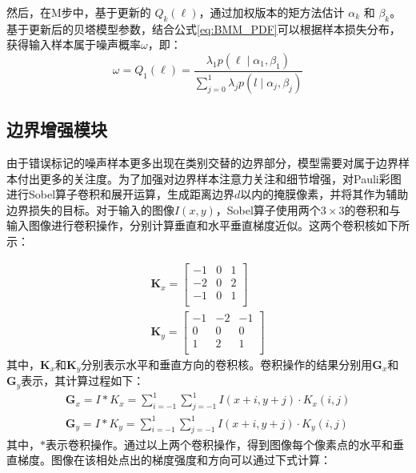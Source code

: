 然后，在M步中，基于更新的 \(Q_k(\ell)\)，通过加权版本的矩方法估计 \(\alpha_k\) 和 \(\beta_k\)。基于更新后的贝塔模型参数，结合公式\eqref{eq:BMM_PDF}可以根据样本损失分布，获得输入样本属于噪声概率$\omega$，即：
\begin{equation}
    \omega =Q_1\left( \ell \right) =\frac{\lambda _1p\left( \ell\mid \alpha _1,\beta _1 \right)}{\sum_{j=0}^1{\lambda _j}p(l\mid \alpha _j,\beta _j)}
\end{equation}

\subsection{边界增强模块}

由于错误标记的噪声样本更多出现在类别交替的边界部分，模型需要对属于边界样本付出更多的关注度。为了加强对边界样本注意力关注和细节增强，对Pauli彩图进行Sobel算子卷积和展开运算，生成距离边界$d$以内的掩膜像素，并将其作为辅助边界损失的目标。对于输入的图像$I(x,y)$，Sobel算子使用两个$3 \times 3$的卷积和与输入图像进行卷积操作，分别计算垂直和水平垂直梯度近似。这两个卷积核如下所示：

\begin{gather}
    \textbf{K}_x=\left[ \begin{matrix}
            -1 & 0 & 1 \\
            -2 & 0 & 2 \\
            -1 & 0 & 1 \\
        \end{matrix} \right]
    \\
    \textbf{K}_y=\left[ \begin{matrix}
            -1 & -2 & -1 \\
            0  & 0  & 0  \\
            1  & 2  & 1  \\
        \end{matrix} \right]
\end{gather}
其中，$\textbf{K}_x$和$\textbf{K}_y$分别表示水平和垂直方向的卷积核。卷积操作的结果分别用$\textbf{G}_x$和$\textbf{G}_y$表示，其计算过程如下：
\begin{gather}
    \textbf{G}_x=I \ast K_x=\sum_{i=-1}^1{\sum_{j=-1}^1{I\left( x+i,y+j \right) \cdot K_x\left( i,j \right)}}
    \\
    \textbf{G}_y=I \ast K_y=\sum_{i=-1}^1{\sum_{j=-1}^1{I\left( x+i,y+j \right) \cdot K_y\left( i,j \right)}}
\end{gather}
其中，$\ast$表示卷积操作。通过以上两个卷积操作，得到图像每个像素点的水平和垂直梯度。图像在该相处点出的梯度强度和方向可以通过下式计算：

